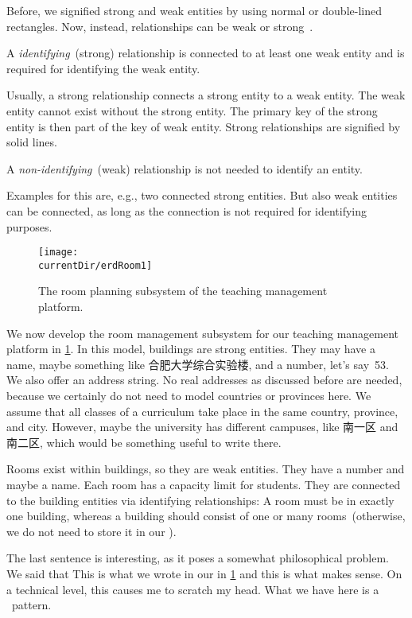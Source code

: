 Before, we signified strong and weak entities by using normal or double-lined rectangles.
Now, instead, relationships can be weak or strong~\cite{P2024C6DS:EM}.%
%
\begin{definition}%
A \emph{identifying}~(strong) relationship is connected to at least one weak entity and is required for identifying the weak entity. %
\end{definition}%
%
Usually, a strong relationship connects a strong entity to a weak entity.
The weak entity cannot exist without the strong entity.
The primary key of the strong entity is then part of the key of weak entity.
Strong relationships are signified by solid lines.%
%
\begin{definition}%
A \emph{non-identifying}~(weak) relationship is not needed to identify an entity.%
\end{definition}%
Examples for this are, e.g., two connected strong entities.
But also weak entities can be connected, as long as the connection is not required for identifying purposes.

\begin{figure}%
\centering%
\texttt{[image: \\currentDir/erdRoom1]}%
\caption{The room planning subsystem of the teaching management platform.}%
\label{fig:erdRoom1}%
\end{figure}%
%
We now develop the room management subsystem for our teaching management platform in \cref{fig:erdRoom1}.
In this model, buildings are strong entities.
They may have a name, maybe something like 合肥大学综合实验楼, and a number, let's say~53.
We also offer an address string.
No real addresses as discussed before are needed, because we certainly do not need to model countries or provinces here.
We assume that all classes of a curriculum take place in the same country, province, and city.
However, maybe the university has different campuses, like 南一区 and 南二区, which would be something useful to write there.

Rooms exist within buildings, so they are weak entities.
They have a number and maybe a name.
Each room has a capacity limit for students.
They are connected to the building entities via identifying relationships:
A room must be in exactly one building, whereas a building should consist of one or many rooms~(otherwise, we do not need to store it in our \db).

The last sentence is interesting, as it poses a somewhat philosophical problem.
We said that 
This is what we wrote in our  in \cref{fig:erdRoom1} and this is what makes sense.
On a technical level, this causes me to scratch my head.
What we have here is a ~pattern.

